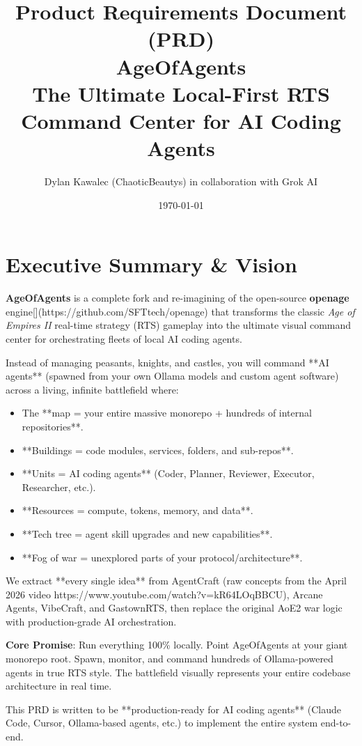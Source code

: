 \documentclass[11pt,a4paper]{article}
\title{\textbf{Product Requirements Document (PRD)}\\
\textbf{AgeOfAgents}\\[0.5em]
\large The Ultimate Local-First RTS Command Center for AI Coding Agents}
\author{Dylan Kawalec (ChaoticBeautys) in collaboration with Grok AI}
\date{\today}
\begin{document}
\maketitle

\tableofcontents
\newpage

\section{Executive Summary \& Vision}

\textbf{AgeOfAgents} is a complete fork and re-imagining of the open-source \textbf{openage} engine[](https://github.com/SFTtech/openage) that transforms the classic \textit{Age of Empires II} real-time strategy (RTS) gameplay into the ultimate visual command center for orchestrating fleets of local AI coding agents.

Instead of managing peasants, knights, and castles, you will command **AI agents** (spawned from your own Ollama models and custom agent software) across a living, infinite battlefield where:
\begin{itemize}
    \item The **map = your entire massive monorepo + hundreds of internal repositories**.
    \item **Buildings = code modules, services, folders, and sub-repos**.
    \item **Units = AI coding agents** (Coder, Planner, Reviewer, Executor, Researcher, etc.).
    \item **Resources = compute, tokens, memory, and data**.
    \item **Tech tree = agent skill upgrades and new capabilities**.
    \item **Fog of war = unexplored parts of your protocol/architecture**.
\end{itemize}

We extract **every single idea** from AgentCraft (raw concepts from the April 2026 video https://www.youtube.com/watch?v=kR64LOqBBCU), Arcane Agents, VibeCraft, and GastownRTS, then replace the original AoE2 war logic with production-grade AI orchestration.

\textbf{Core Promise}: Run everything 100\% locally. Point AgeOfAgents at your giant monorepo root. Spawn, monitor, and command hundreds of Ollama-powered agents in true RTS style. The battlefield visually represents your entire codebase architecture in real time.

This PRD is written to be **production-ready for AI coding agents** (Claude Code, Cursor, Ollama-based agents, etc.) to implement the entire system end-to-end.
\end{document}
